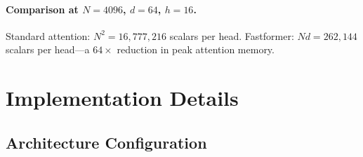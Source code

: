 \documentclass[11pt,a4paper]{article}
\theoremstyle{definition}
\begin{document}
\paragraph{Comparison at $N=4096$, $d=64$, $h=16$.}
Standard attention: $N^{2}=16{,}777{,}216$ scalars per head.
Fastformer: $Nd=262{,}144$ scalars per head---a $64\times$ reduction in peak attention memory.

\section{Implementation Details}
\label{sec:implementation}

\subsection{Architecture Configuration}
\end{document}
